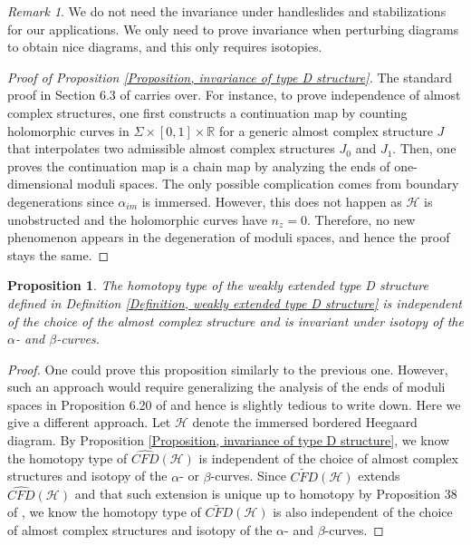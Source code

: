 \documentclass{amsart}
\newtheorem{prop}[thm]{Proposition}
\theoremstyle{definition}
\theoremstyle{remark}
\newtheorem{rmk}[thm]{Remark}
\numberwithin{equation}{section}
\numberwithin{equation}{section} \makeatletter
\begin{document}
\begin{rmk}
We do not need the invariance under handleslides and stabilizations for our applications. We only need to prove invariance when perturbing diagrams to obtain nice diagrams, and this only requires isotopies.
\end{rmk}
\begin{proof}[Proof of Proposition \ref{Proposition, invariance of type D structure}]
The standard proof in Section 6.3 of \cite{LOT18} carries over. For instance, to prove independence of almost complex structures, one first constructs a continuation map by counting holomorphic curves in $\Sigma\times[0,1]\times \mathbb{R}$ for a generic almost complex structure $J$ that interpolates two admissible almost complex structures $J_0$ and $J_1$. Then, one proves the continuation map is a chain map by analyzing the ends of one-dimensional moduli spaces. The only possible complication comes from boundary degenerations since $\alpha_{im}$ is immersed. However, this does not happen as $\mathcal{H}$ is unobstructed and the holomorphic curves have $n_z=0$. Therefore, no new phenomenon appears in the degeneration of moduli spaces, and hence the proof stays the same.
\end{proof}
\begin{prop}\label{Proposition, invariance of weakly type D structures}
The homotopy type of the weakly extended type D structure defined in Definition \ref{Definition, weakly extended type D structure} is independent of the choice of the almost complex structure and is invariant under isotopy of the $\alpha$- and $\beta$-curves.  
\end{prop}
\begin{proof}
One could prove this proposition similarly to the previous one. However, such an approach would require generalizing the analysis of the ends of moduli spaces in Proposition 6.20 of \cite{LOT18} and hence is slightly tedious to write down. Here we give a different approach. Let $\mathcal{H}$ denote the immersed bordered Heegaard diagram. By Proposition \ref{Proposition, invariance of type D structure}, we know the homotopy type of $\widehat{CFD}(\mathcal{H})$ is independent of the choice of almost complex structures and isotopy of the $\alpha$- or $\beta$-curves. Since $\widetilde{CFD}(\mathcal{H})$ extends $\widehat{CFD}(\mathcal{H})$ and that such extension is unique up to homotopy by Proposition 38 of \cite{hanselman2016bordered}, we know the homotopy type of $\widetilde{CFD}(\mathcal{H})$ is also independent of the choice of almost complex structures and isotopy of the $\alpha$- and $\beta$-curves.
\end{proof}
\end{document}
